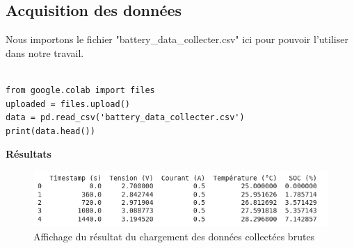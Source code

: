 \subsection{Acquisition des données}

Nous importons le fichier "battery\_data\_collecter.csv" ici pour pouvoir l'utiliser dans notre travail.

\begin{verbatim}

from google.colab import files
uploaded = files.upload() 
data = pd.read_csv('battery_data_collecter.csv')
print(data.head())

\end{verbatim}

\textbf{Résultats}
\begin{figure}[H]
	\centering
	\includegraphics[width=16cm]{./img/resultats/loadData.png}
    \caption{Affichage du résultat du chargement des données collectées brutes}

\end{figure}


